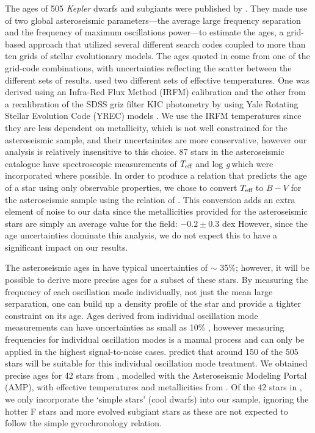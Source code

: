 \documentclass[10pt,preprint]{aastex}
\newcommand{\logg}{log \emph{g}}
\newcommand{\teff}{$T_{\rm{eff}}$}
\begin{document}
The ages of 505 {\it Kepler} dwarfs and subgiants were published by \citet{Chaplin2014}.
They made use of two global asteroseismic parameters---the average large frequency separation and the frequency of maximum oscillations power---to estimate the ages, a grid-based approach that utilized several different search codes coupled to more than ten grids of stellar evolutionary models.
The ages quoted in \citet{Chaplin2014} come from one of the grid-code combinations, with uncertainties reflecting the scatter between the different sets of results.
\citet{Chaplin2014} used two different sets of effective temperatures. One was derived using an Infra-Red Flux Method (IRFM) calibration \citep{Casagrande2010, SilvaAguirre2012} and the other from a recalibration of the SDSS griz filter KIC photometry by \citet{Pinsonneault2012} using Yale Rotating Stellar Evolution Code (YREC) models \citep{Demarque2004}.
We use the IRFM temperatures since they are less dependent on metallicity, which is not well constrained for the asteroseismic sample, and their uncertainites are more conservative, however our analysis is relatively insensitive to this choice.
87 stars in the asteroseismic catalogue have spectroscopic measurements of \teff$~$and \logg$~$which were incorporated where possible.
In order to produce a relation that predicts the age of a star using only observable properties, we chose to convert \teff$~$to $B-V$ for the asteroseismic sample using the relation of \citet{Sekiguchi2000}.
This conversion adds an extra element of noise to our data since the metallicities provided for the asteroseismic stars are simply an average value for the field: $-0.2\pm0.3$ dex \citep[see e.g.][]{Silva_Aguirre2011}
However, since the age uncertainties dominate this analysis, we do not expect this to have a significant impact on our results.

The asteroseismic ages in \citet{Chaplin2014} have typical uncertainties of $\sim$ 35\%; however, it will be possible to derive more precise ages for a subset of these stars.
By measuring the frequency of each oscillation mode individually, not just the mean large serparation, one can build up a density profile of the star and provide a tighter constraint on its age.
Ages derived from individual oscillation mode measurements can have uncertainties as small as 10\% \citep{Brown1994, SilvaAguirre2013}, however measuring frequencies for individual oscillation modes is a manual process and can only be applied in the highest signal-to-noise cases.
\citet{Chaplin2014} predict that around 150 of the 505 stars will be suitable for this individual oscillation mode treatment.
We obtained precise ages for 42 stars from \citet{Metcalfe2014}, modelled with the Asteroseismic Modeling Portal (AMP), with effective temperatures and metallicities from \citet{Bruntt2012}.
Of the 42 stars in \citet{Metcalfe2014}, we only incorporate the `simple stars' (cool dwarfs) into our sample, ignoring the hotter F stars and more evolved subgiant stars as these are not expected to follow the simple gyrochronology relation.
\end{document}
